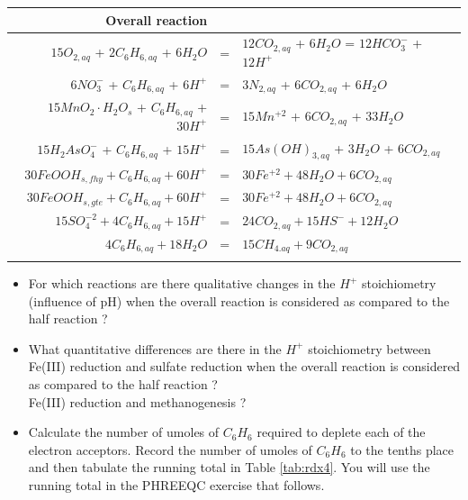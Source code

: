 \begin{table}[h]
\centering
\footnotesize
\begin{tabular}{rll}
\toprule 
Overall reaction &  &\\
\midrule
$15O_{2,aq}$ + $2C_6H_{6,aq}$ + $6H_2O$    & = & $12CO_{2,aq}$ + $6H_2O$  = $12HCO_3^-$ + $12H^+$  \\
$6NO_3^-$ + $C_6H_{6,aq}$ + $6H^+$         & = & $3N_{2,aq}$ + $6CO_{2,aq}$ + $6H_2O$ \\
$15MnO_2·H_2O_s$ + $C_6H_{6,aq}$ + $30H^+$ & = & $15Mn^{+2}$ + $6CO_{2,aq}$ + $33H_2O$ \\
$15H_2AsO_4^-$ + $C_6H_{6,aq}$  + $15H^+$  & = & $15As(OH)_{3,aq}$ +  $3H_2O$ + $6CO_{2,aq}$ \\
$30FeOOH_{s,fhy} + C_6H_{6,aq} + 60H^+$    & = & $30Fe^{+2} + 48H_2O + 6CO_{2,aq}$ \\
$30FeOOH_{s,gte} + C_6H_{6,aq} + 60H^+$    & = & $30Fe^{+2} + 48H_2O + 6CO_{2,aq}$ \\
$15SO_4^{-2} + 4C_6H_{6,aq} + 15H^+$       & = & $24CO_{2,aq} + 15HS^- + 12H_2O$ \\
$4C_6H_{6,aq} + 18H_2O$                    & = & $15CH_{4.aq} + 9CO_{2,aq}$ \\
\bottomrule
\label{tab:rdx3}
\end{tabular}
\end{table}	

\begin{itemize}

\item For which reactions are there qualitative changes in the $H^+$
stoichiometry (influence of pH) when the overall reaction 
is considered as compared to the half reaction ?

\item What quantitative differences are there in the
$H^+$ stoichiometry between Fe(III) reduction and sulfate 
reduction when the overall reaction is considered as compared to 
the half reaction ?  \\
Fe(III) reduction and methanogenesis ?

\item Calculate the number of umoles of $C_6H_6$ required to deplete 
each of the electron acceptors.  
Record the number of umoles of $C_6H_6$ to the tenths place and 
then tabulate the running total in Table \ref{tab:rdx4}.  
You will use the running total in the PHREEQC exercise that follows.

\end{itemize}

